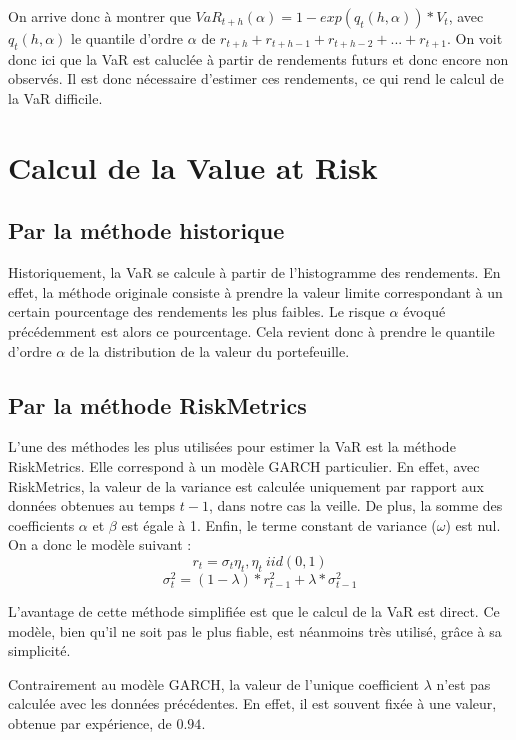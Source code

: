 			On arrive donc à montrer que $VaR_{t+h}(\alpha) = 1 - exp{(q_{t}(h,\alpha))}*V_{t}$, avec $q_{t}(h,\alpha)$ le quantile d'ordre $\alpha$ de $r_{t+h}+r_{t+h-1}+r_{t+h-2}+...+r_{t+1}$. On voit donc ici que la VaR est caluclée à partir de rendements futurs et donc encore non observés. Il est donc nécessaire d'estimer ces rendements, ce qui rend le calcul de la VaR difficile.
	
	\section{Calcul de la Value at Risk}

		\subsection{Par la méthode historique}
		\label{subsubsection:methode-historique}
			Historiquement, la VaR se calcule à partir de l'histogramme des rendements. En effet, la méthode originale consiste à prendre la valeur limite correspondant à un certain pourcentage des rendements les plus faibles. Le risque $\alpha$ évoqué précédemment est alors ce pourcentage. Cela revient donc à prendre le quantile d'ordre $\alpha$ de la distribution de la valeur du portefeuille.


		\subsection{Par la méthode RiskMetrics}
		\label{subsubsection:methode-riskmetrics}
			L'une des méthodes les plus utilisées pour estimer la VaR est la méthode RiskMetrics. Elle correspond à un modèle GARCH particulier. En effet, avec RiskMetrics, la valeur de la variance est calculée uniquement par rapport aux données obtenues au temps $t-1$, dans notre cas la veille. De plus, la somme des coefficients $\alpha$ et $\beta$ est égale à 1. Enfin, le terme constant de variance ($\omega$) est nul. On a donc le modèle suivant :
			\[r_t = \sigma_t\eta_t , \eta_t~iid(0,1)\]
			\[\sigma_t^2 = (1-\lambda)*r_{t-1}^2+\lambda*\sigma_{t-1}^2\]

			L'avantage de cette méthode simplifiée est que le calcul de la VaR est direct. Ce modèle, bien qu'il ne soit pas le plus fiable, est néanmoins très utilisé, grâce à sa simplicité.

			Contrairement au modèle GARCH, la valeur de l'unique coefficient $\lambda$ n'est pas calculée avec les données précédentes. En effet, il est souvent fixée à une valeur, obtenue par expérience, de $0.94$.


